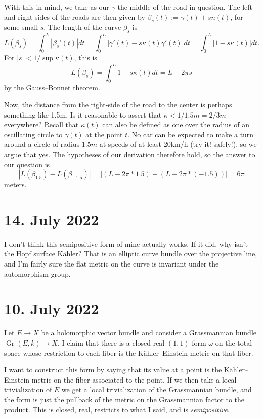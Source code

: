 \documentclass[11pt]{amsart}
\theoremstyle{definition}
\DeclareMathOperator{\Gr}{Gr}
\begin{document}
With this in mind, we take as our $\gamma$ the middle of the road in question.
The left- and right-sides of the roads are then given by $\beta_s(t) := \gamma(t)
+ s n(t)$, for some small $s$.
The length of the curve $\beta_s$ is
$$
L(\beta_s)
= \int_0^L |\beta_s'(t)| dt
= \int_0^L |\gamma'(t) - s \kappa(t) \gamma'(t)| dt
= \int_0^L |1 - s \kappa(t)| dt.
$$
For $|s| < 1/ \sup \kappa(t)$, this is
$$
L(\beta_s)
= \int_0^L 1 - s \kappa(t) dt
= L - 2\pi s
$$
by the Gauss--Bonnet theorem.

Now, the distance from the right-side of the road to the center is perhaps something like 1.5m.
Is it reasonable to assert that $\kappa < 1/1.5m = 2/3m$ everywhere?
Recall that $\kappa(t)$ can also be defined as one over the radius of an oscillating circle to $\gamma(t)$ at the point $t$.
No car can be expected to make a turn around a circle of radius $1.5m$ at speeds
of at least 20km/h (try it! safely!), so we argue that yes.
The hypotheses of our derivation therefore hold, so the answer to our question is
$$
|L(\beta_{1.5}) - L(\beta_{-1.5})|
= |(L - 2\pi * 1.5) - (L - 2\pi * (-1.5))|
= 6\pi
$$
meters.



\section*{14. July 2022}

I don't think this semipositive form of mine actually works. If it did, why
isn't the Hopf surface K\"ahler? That is an elliptic curve bundle over the
projective line, and I'm fairly sure the flat metric on the curve is invariant
under the automorphism group.


\section*{10. July 2022}

Let $E \to X$ be a holomorphic vector bundle and consider a Grassmannian bundle
$\Gr(E,k) \to X$. I claim that there is a closed real $(1,1)$-form $\omega$ on
the total space whose restriction to each fiber is the K\"ahler--Einstein metric
on that fiber.

I want to construct this form by saying that its value at a point is the
K\"ahler--Einstein metric on the fiber associated to the point. If we then take
a local trivialization of $E$ we get a local trivialization of the Grassmannian
bundle, and the form is just the pullback of the metric on the Grassmannian
factor to the product. This is closed, real, restricts to what I said, and is
\emph{semipositive}.
\end{document}
